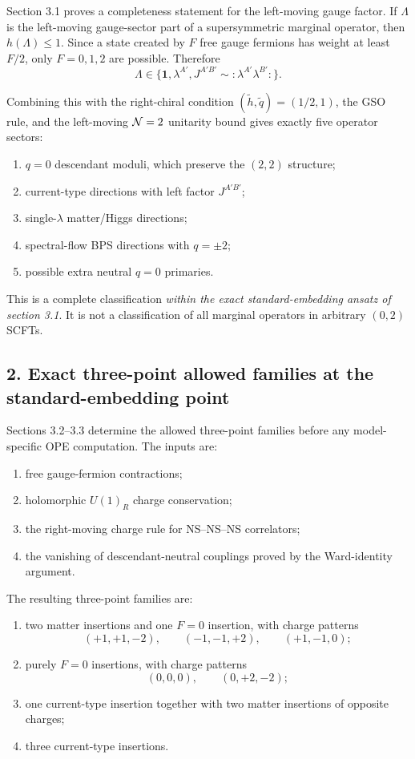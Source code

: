 \documentclass[11pt]{article}
\newcommand{\wt}[1]{\widetilde{#1}}
\begin{document}
Section 3.1 proves a completeness statement for the left-moving gauge factor. If $\Lambda$ is the left-moving gauge-sector part of a supersymmetric marginal operator, then $h(\Lambda)\le 1$. Since a state created by $F$ free gauge fermions has weight at least $F/2$, only $F=0,1,2$ are possible. Therefore
\[
\Lambda\in\{\mathbf 1,\lambda^{A'},J^{A'B'}\sim :\lambda^{A'}\lambda^{B'}:\}.
\]

Combining this with the right-chiral condition $(\wt h,\wt q)=(1/2,1)$, the GSO rule, and the left-moving ${\cal N}=2$ unitarity bound gives exactly five operator sectors:
\begin{enumerate}
\item $q=0$ descendant moduli, which preserve the $(2,2)$ structure;
\item current-type directions with left factor $J^{A'B'}$;
\item single-$\lambda$ matter/Higgs directions;
\item spectral-flow BPS directions with $q=\pm 2$;
\item possible extra neutral $q=0$ primaries.
\end{enumerate}

This is a complete classification \emph{within the exact standard-embedding ansatz of section 3.1}. It is not a classification of all marginal operators in arbitrary $(0,2)$ SCFTs.

\subsection*{2. Exact three-point allowed families at the standard-embedding point}

Sections 3.2--3.3 determine the allowed three-point families before any model-specific OPE computation. The inputs are:
\begin{enumerate}
\item free gauge-fermion contractions;
\item holomorphic $U(1)_R$ charge conservation;
\item the right-moving charge rule for NS--NS--NS correlators;
\item the vanishing of descendant-neutral couplings proved by the Ward-identity argument.
\end{enumerate}

The resulting three-point families are:
\begin{enumerate}
\item two matter insertions and one $F=0$ insertion, with charge patterns
\[
(+1,+1,-2),\qquad (-1,-1,+2),\qquad (+1,-1,0);
\]
\item purely $F=0$ insertions, with charge patterns
\[
(0,0,0),\qquad (0,+2,-2);
\]
\item one current-type insertion together with two matter insertions of opposite charges;
\item three current-type insertions.
\end{enumerate}
\end{document}
